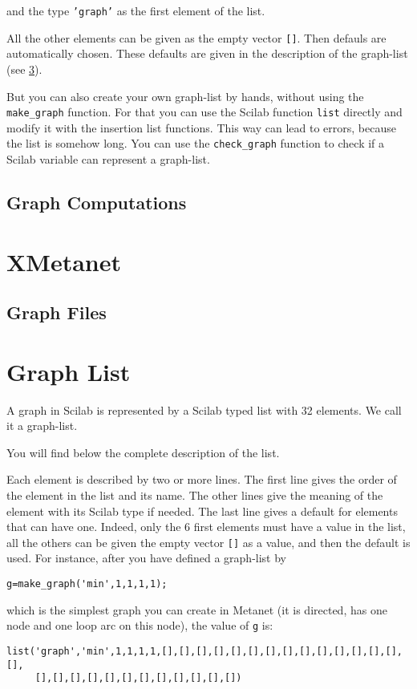 \documentclass[11pt]{report}
\newcommand{\T}[1]{{\tt #1}}
\begin{document}
and the type \T{'graph'} as the
first element of the list.

All the other elements can be given as the empty vector \T{[]}. Then
defauls are automatically chosen. These defaults are given in the
description of the graph-list (see \ref{graph-list}).

But you can also create your own graph-list by hands, without using the 
\T{make\_graph} function. For that you can use the Scilab function
\T{list}
directly and modify it with the insertion list functions. This way can lead
to errors, because the list is somehow long. You can use the 
\T{check\_graph}
function to check if a Scilab variable can represent a graph-list.

\section{Graph Computations}

\chapter{XMetanet}\label{XMetanet}

\section{Graph Files}

\chapter{Graph List}\label{graph-list}
A graph in Scilab is represented by a Scilab typed list with 32 elements. 
We call it a
graph-list.

You will find below the complete description of the list.

Each element is described by two or more lines.
The first line gives the order of the element in the list and its name.
The other lines give the meaning of the element with its Scilab type if
needed.
The last line gives a default for elements that can have one.
Indeed, only the 6 first elements must have a value in the list, all the 
others can be given the empty vector \T{[]} as a value, and then the default 
is used.
For instance, after you have defined a graph-list by
\begin{verbatim}
g=make_graph('min',1,1,1,1);
\end{verbatim}

which is the simplest graph you can create in Metanet (it is directed, has 
one node and one loop arc on this node), the value of \T{g} is:
\begin{verbatim}
list('graph','min',1,1,1,1,[],[],[],[],[],[],[],[],[],[],[],[],[],[],[],
     [],[],[],[],[],[],[],[],[],[],[],[])
\end{verbatim}
\end{document}
